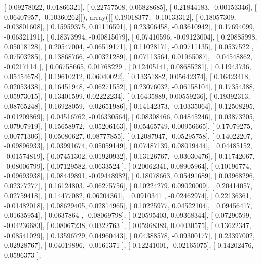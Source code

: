 \documentclass{article}
\begin{document}
       [ 0.09278022,  0.01866321],
       [ 0.22757508,  0.06828685],
       [ 0.21844183, -0.00153346],
       [ 0.06407957, -0.10360262]]), array([[ 0.19018377, -0.10133312],
       [ 0.18057309, -0.03801608],
       [ 0.15959375,  0.01116591],
       [ 0.23306458, -0.03610942],
       [ 0.17694099, -0.06321191],
       [ 0.18373994, -0.00815079],
       [ 0.07410596, -0.09123004],
       [ 0.20885998,  0.05018128],
       [ 0.20547004, -0.06519171],
       [ 0.11028171, -0.09711135],
       [ 0.0537522 ,  0.07503285],
       [ 0.13868766, -0.00321289],
       [ 0.07113564,  0.01965087],
       [ 0.04548862, -0.0217114 ],
       [ 0.06758665,  0.01768229],
       [ 0.12405141,  0.08685281],
       [ 0.11943736,  0.05454678],
       [ 0.19610212,  0.06040022],
       [ 0.13351882,  0.05642374],
       [ 0.16423418,  0.02053438],
       [ 0.16451948, -0.06271552],
       [ 0.23076032, -0.06158104],
       [ 0.17354388,  0.05973015],
       [ 0.13401599,  0.02222234],
       [ 0.16435889,  0.00559236],
       [ 0.19392313,  0.08765248],
       [ 0.16928059, -0.02651986],
       [ 0.14142373, -0.10335064],
       [ 0.12508295, -0.01209869],
       [ 0.04516762, -0.06330564],
       [ 0.08308466,  0.04845246],
       [ 0.03873205,  0.07907919],
       [ 0.15658972, -0.05206163],
       [ 0.05465749,  0.00956665],
       [ 0.17079275,  0.00771306],
       [ 0.05080627,  0.08777855],
       [ 0.12087947, -0.05295758],
       [ 0.14022207, -0.09896933],
       [ 0.03991674,  0.05059149],
       [ 0.07487139,  0.08019444],
       [ 0.04485152, -0.01574819],
       [ 0.07451302,  0.01920932],
       [ 0.13126767, -0.03030476],
       [ 0.11742067, -0.08006799],
       [ 0.07129582,  0.0633524 ],
       [ 0.20062341,  0.08905964],
       [ 0.10196774, -0.09693938],
       [ 0.08449891, -0.09448982],
       [ 0.18078663,  0.05491689],
       [ 0.03968296,  0.02377277],
       [ 0.16124803, -0.06275756],
       [ 0.10224279,  0.09020009],
       [ 0.20414057,  0.02759418],
       [ 0.14477082,  0.06204361],
       [ 0.0910341 , -0.02462974],
       [ 0.22136361, -0.01482018],
       [ 0.08629405,  0.02814965],
       [ 0.10225977,  0.04522104],
       [ 0.09456417,  0.01635954],
       [ 0.0637864 , -0.08069798],
       [ 0.20595403,  0.09368344],
       [ 0.07290599, -0.04236683],
       [ 0.08067238,  0.0322763 ],
       [ 0.05968389,  0.04030575],
       [ 0.13622347, -0.08541029],
       [ 0.13596729,  0.04960443],
       [ 0.04388578, -0.09300177],
       [ 0.23397002,  0.02928767],
       [ 0.04019896, -0.0161371 ],
       [ 0.12241001, -0.02165075],
       [ 0.14202476,  0.0596373 ],
\end{document}
